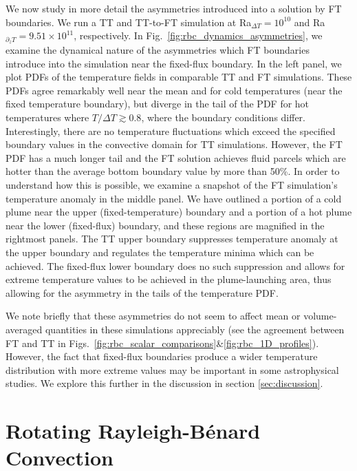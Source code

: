 \documentclass[aps, pre, onecolumn, nofootinbib, notitlepage, groupedaddress, amsfonts, amssymb, amsmath, longbibliography, superscriptaddress]{revtex4-1}
\newcommand{\RB}{Rayleigh-B\'{e}nard }
\begin{document}
We now study in more detail the asymmetries introduced into a solution by FT boundaries.
We run a TT and TT-to-FT simulation at Ra$_{\Delta T} = 10^{10}$ and Ra$_{\partial_z T} = 9.51 \times 10^{11}$, respectively.
In Fig.~\ref{fig:rbc_dynamics_asymmetries}, we examine the dynamical nature of the asymmetries which FT boundaries introduce into the simulation near the fixed-flux boundary.
In the left panel, we plot PDFs of the temperature fields in comparable TT and FT simulations.
These PDFs agree remarkably well near the mean and for cold temperatures (near the fixed temperature boundary), but diverge in the tail of the PDF for hot temperatures where $T/\Delta T \gtrsim 0.8$, where the boundary conditions differ.
Interestingly, there are no temperature fluctuations which exceed the specified boundary values in the convective domain for TT simulations.
However, the FT PDF has a much longer tail and the FT solution achieves fluid parcels which are hotter than the average bottom boundary value by more than 50\%.
In order to understand how this is possible, we examine a snapshot of the FT simulation's temperature anomaly in the middle panel.
We have outlined a portion of a cold plume near the upper (fixed-temperature) boundary and a portion of a hot plume near the lower (fixed-flux) boundary, and these regions are magnified in the rightmost panels.
The TT upper boundary suppresses temperature anomaly at the upper boundary and regulates the temperature minima which can be achieved.
The fixed-flux lower boundary does no such suppression and allows for extreme temperature values to be achieved in the plume-launching area, thus allowing for the asymmetry in the tails of the temperature PDF.

We note briefly that these asymmetries do not seem to affect mean or volume-averaged quantities in these simulations appreciably (see the agreement between FT and TT in Figs.~\ref{fig:rbc_scalar_comparisons}\&\ref{fig:rbc_1D_profiles}).
However, the fact that fixed-flux boundaries produce a wider temperature distribution with more extreme values may be important in some astrophysical studies.
We explore this further in the discussion in section \ref{sec:discussion}.





\section{Rotating \RB Convection}
\label{sec:rotating_results}
\end{document}
